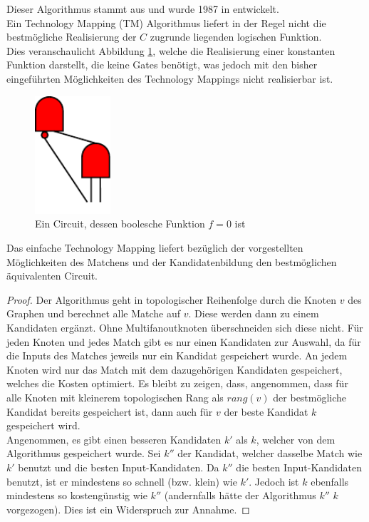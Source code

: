 \documentclass[11pt, a4paper, german]{article}
\newcommand{\TM}{Technology  Mapping }
\begin{document}
Dieser Algorithmus stammt aus \cite{Elbert} und wurde 1987 in \cite{DAGON} entwickelt.\\
Ein \TM (TM) Algorithmus liefert in der Regel nicht die bestmögliche Realisierung der $C$ zugrunde liegenden logischen Funktion.\\

Dies veranschaulicht Abbildung \ref{bild:compl_redundant}, welche die Realisierung einer konstanten Funktion darstellt, die keine Gates benötigt, was jedoch mit den bisher eingeführten  Möglichkeiten des Technology Mappings nicht realisierbar ist.
\begin{figure}
		\includegraphics[width = 2.8cm]{pictures/compiled/compl_redundant}
		\caption{Ein Circuit, dessen boolesche Funktion $f = 0 $ ist}
		\label{bild:compl_redundant}
\end{figure}
\begin{cor}
	Das einfache \TM  liefert bezüglich der vorgestellten Möglichkeiten des Matchens und der Kandidatenbildung den bestmöglichen äquivalenten Circuit.
\end{cor}
\begin{proof} 
	Der Algorithmus geht in topologischer Reihenfolge durch die Knoten $v$ des Graphen und berechnet alle Matche auf $v$. Diese werden dann zu einem Kandidaten ergänzt. 
 Ohne Multifanoutknoten überschneiden sich diese nicht. Für jeden Knoten und jedes Match gibt es nur einen Kandidaten zur Auswahl, da für die Inputs des Matches jeweils nur ein Kandidat gespeichert wurde. An jedem Knoten wird nur das Match mit dem dazugehörigen Kandidaten gespeichert, welches die Kosten optimiert. 
 Es bleibt zu zeigen, dass, angenommen, dass für alle Knoten mit kleinerem topologischen Rang als $rang(v)$ der bestmögliche Kandidat bereits gespeichert ist, dann auch für $v$ der beste Kandidat $k$ gespeichert wird. \\
 Angenommen, es gibt einen besseren Kandidaten $k'$ als $k$, welcher von dem Algorithmus gespeichert wurde. Sei $k''$ der Kandidat, welcher dasselbe Match wie $k'$ benutzt und die besten Input-Kandidaten. Da $k''$ die besten Input-Kandidaten benutzt, ist er mindestens so schnell (bzw. klein) wie $k'$. Jedoch ist $k$ ebenfalls mindestens so kostengünstig wie $k''$ (andernfalls hätte der Algorithmus $k''$ $k$ vorgezogen). Dies ist ein Widerspruch zur Annahme. 
\end{proof}
 
\end{document}
